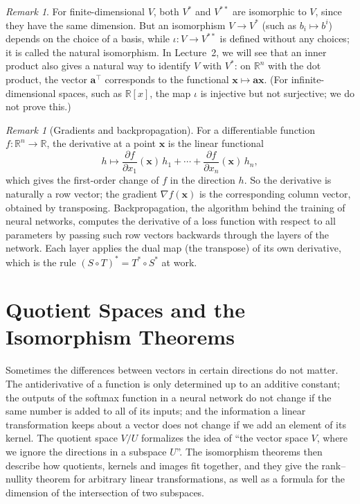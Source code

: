 \documentclass[11pt]{article}
\theoremstyle{definition}
\theoremstyle{plain}
\theoremstyle{remark}
\newtheorem{remark}[definition]{Remark}
\begin{document}
\begin{remark}
    For finite-dimensional $V$, both $V^*$ and $V^{**}$ are isomorphic to $V$, since they have the same dimension. But an isomorphism $V \to V^*$ (such as $b_i \mapsto b^i$) depends on the choice of a basis, while $\iota: V \to V^{**}$ is defined without any choices; it is called the natural isomorphism. In Lecture~2, we will see that an inner product also gives a natural way to identify $V$ with $V^*$: on $\mathbb{R}^n$ with the dot product, the vector $\mathbf{a}^\top$ corresponds to the functional $\mathbf{x} \mapsto \mathbf{a}\mathbf{x}$. (For infinite-dimensional spaces, such as $\mathbb{R}[x]$, the map $\iota$ is injective but not surjective; we do not prove this.)
\end{remark}

\begin{remark}[Gradients and backpropagation]
    For a differentiable function $f: \mathbb{R}^n \to \mathbb{R}$, the derivative at a point $\mathbf{x}$ is the linear functional
    \[h \mapsto \frac{\partial f}{\partial x_1}(\mathbf{x})\, h_1 + \cdots + \frac{\partial f}{\partial x_n}(\mathbf{x})\, h_n,\]
    which gives the first-order change of $f$ in the direction $h$. So the derivative is naturally a row vector; the gradient $\nabla f(\mathbf{x})$ is the corresponding column vector, obtained by transposing. Backpropagation, the algorithm behind the training of neural networks, computes the derivative of a loss function with respect to all parameters by passing such row vectors backwards through the layers of the network. Each layer applies the dual map (the transpose) of its own derivative, which is the rule $(S \circ T)^* = T^* \circ S^*$ at work.
\end{remark}

\section{Quotient Spaces and the Isomorphism Theorems}\label{sec:quotient}

Sometimes the differences between vectors in certain directions do not matter. The antiderivative of a function is only determined up to an additive constant; the outputs of the softmax function in a neural network do not change if the same number is added to all of its inputs; and the information a linear transformation keeps about a vector does not change if we add an element of its kernel. The quotient space $V/U$ formalizes the idea of ``the vector space $V$, where we ignore the directions in a subspace $U$''. The isomorphism theorems then describe how quotients, kernels and images fit together, and they give the rank--nullity theorem for arbitrary linear transformations, as well as a formula for the dimension of the intersection of two subspaces.
\end{document}
